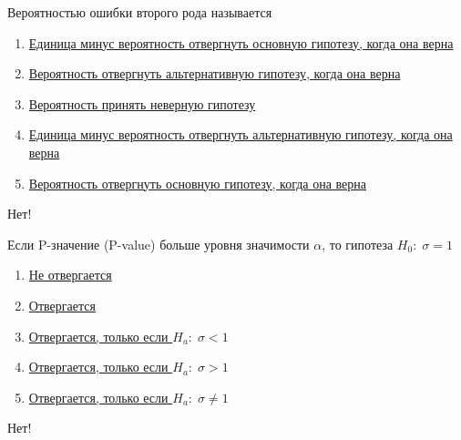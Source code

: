 \documentclass[t]{beamer}
\begin{document}
 \begin{frame} \label{8-No} 
\begin{block}{8} 

Вероятностью ошибки второго рода называется
 


 \end{block} 
\begin{enumerate} 
\item[] \hyperlink{8-No}{\beamergotobutton{} Единица минус  вероятность отвергнуть основную гипотезу, когда она верна}
\item[] \hyperlink{8-Yes}{\beamergotobutton{} Вероятность отвергнуть альтернативную гипотезу, когда она верна}
\item[] \hyperlink{8-No}{\beamergotobutton{} Вероятность принять неверную гипотезу}
\item[] \hyperlink{8-No}{\beamergotobutton{} Единица минус  вероятность отвергнуть альтернативную гипотезу, когда она верна}
\item[] \hyperlink{8-No}{\beamergotobutton{} Вероятность отвергнуть основную гипотезу, когда она верна}
\end{enumerate} 

 \alert{Нет!} 
\end{frame} 


 \begin{frame} \label{9-No} 
\begin{block}{9} 

Если P-значение (P-value) больше уровня значимости  $\alpha$, то гипотеза  $H_0: \; \sigma=1$
 


 \end{block} 
\begin{enumerate} 
\item[] \hyperlink{9-Yes}{\beamergotobutton{} Не отвергается}
\item[] \hyperlink{9-No}{\beamergotobutton{} Отвергается}
\item[] \hyperlink{9-No}{\beamergotobutton{} Отвергается, только если  $H_a: \; \sigma<1$}
\item[] \hyperlink{9-No}{\beamergotobutton{} Отвергается, только если  $H_a: \; \sigma>1$}
\item[] \hyperlink{9-No}{\beamergotobutton{} Отвергается, только если  $H_a: \; \sigma\neq 1$}
\end{enumerate} 

 \alert{Нет!} 
\end{frame} 
\end{document}
